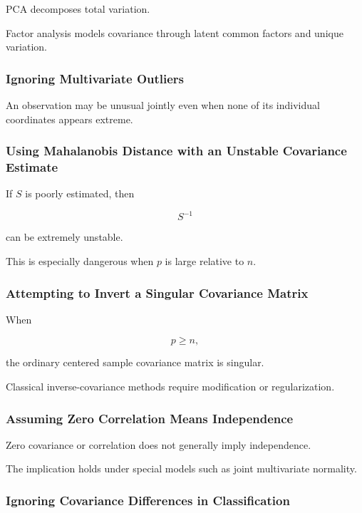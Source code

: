 PCA decomposes total variation.

Factor analysis models covariance through latent common factors and
unique variation.

\subsubsection{Ignoring Multivariate Outliers}

An observation may be unusual jointly even when none of its individual
coordinates appears extreme.

\subsubsection{Using Mahalanobis Distance with an Unstable Covariance Estimate}

If \(S\) is poorly estimated, then

\[
S^{-1}
\]

can be extremely unstable.

This is especially dangerous when \(p\) is large relative to \(n\).

\subsubsection{Attempting to Invert a Singular Covariance Matrix}

When

\[
p\geq n,
\]

the ordinary centered sample covariance matrix is singular.

Classical inverse-covariance methods require modification or
regularization.

\subsubsection{Assuming Zero Correlation Means Independence}

Zero covariance or correlation does not generally imply independence.

The implication holds under special models such as joint multivariate
normality.

\subsubsection{Ignoring Covariance Differences in Classification}

